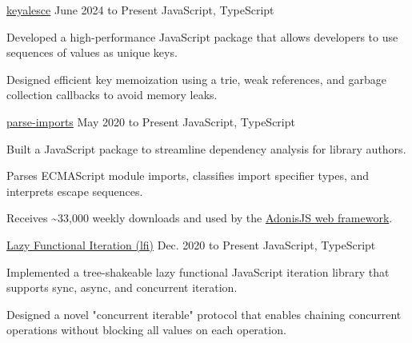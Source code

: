 
\begin{cventry}
    {\href{https://github.com/TomerAberbach/keyalesce}{keyalesce}}{}
    {June 2024 to Present}
    {JavaScript, TypeScript}
    \begin{cvitems}
        \item Developed a high-performance JavaScript package that allows developers to use sequences of values as unique keys.
        \item Designed efficient key memoization using a trie, weak references, and garbage collection callbacks to avoid memory leaks.
    \end{cvitems}
\end{cventry}

\begin{cventry}
    {\href{https://github.com/TomerAberbach/parse-imports}{parse-imports}}{}
    {May 2020 to Present}
    {JavaScript, TypeScript}
    \begin{cvitems}
        \item Built a JavaScript package to streamline dependency analysis for library authors.
        \item Parses ECMAScript module imports, classifies import specifier types, and interprets escape sequences.
        \item Receives \~{}33,000 weekly downloads and used by the \href{https://adonisjs.com}{AdonisJS web framework}.
    \end{cvitems}
\end{cventry}

\begin{cventry}
    {\href{https://github.com/TomerAberbach/lfi}{Lazy Functional Iteration (lfi)}}{}
    {Dec. 2020 to Present}
    {JavaScript, TypeScript}
    \begin{cvitems}
        \item Implemented a tree-shakeable lazy functional JavaScript iteration library that supports sync, async, and concurrent iteration.
        \item Designed a novel "concurrent iterable" protocol that enables chaining concurrent operations without blocking all values on each operation.
    \end{cvitems}
\end{cventry}
